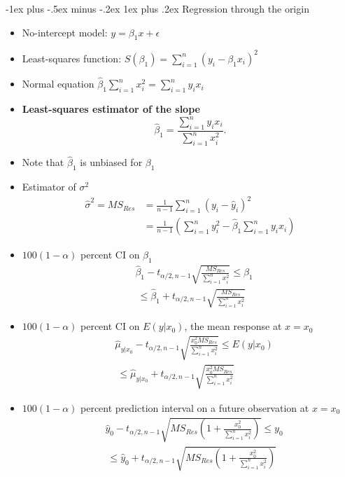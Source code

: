 \documentclass[frenchspacing,9pt,landscape,a4paper]{article}
\makeatletter
\renewcommand{\subsubsection}{\@startsection{subsubsection}{3}{0mm}%
                                {-1ex plus -.5ex minus -.2ex}%
                                {1ex plus .2ex}%
                                {\normalfont\small\bfseries}}
\makeatother
\begin{document}
\begin{multicols}{3}
\subsubsection{Regression through the origin}
\begin{itemize}
	\item No-intercept model: $y=\beta_1x+\epsilon$
	\item Least-squares function: $S(\beta_1)=\sum_{i=1}^n(y_i-\beta_1x_i)^2$
	\item Normal equation $\hat{\beta}_1\sum_{i=1}^n x_i^2=\sum_{i=1}^n y_ix_i$
	\item \textbf{Least-squares estimator of the slope}
		 \[
			 \hat{\beta}_1=\frac{\sum_{i=1}^n y_ix_i}{\sum_{i=1}^n x_i^2}
		.\]
	\item Note that $\hat{\beta}_1$ is unbiased for $\beta_1$
	\item Estimator of $\sigma^2$
		\begin{align*}
			\hat{\sigma}^2=MS_{Res}&=\frac{1}{n-1}\sum_{i=1}^n(y_i-\hat{y}_i)^2\\
								   &=\frac{1}{n-1}\left(\sum_{i=1}^n y_i^2-\hat{\beta}_1\sum_{i=1}^n y_ix_i\right)		
		\end{align*}	
	\item $100(1-\alpha)$ percent CI on  $\beta_1$
		\begin{align*}
			&\hat{\beta}_1-t_{\alpha /2,n-1}\sqrt{\frac{MS_{Res}}{\sum_{i=1}^n x_i^2}}\leq\beta_1\\
			&\ \leq\hat{\beta}_1+t_{\alpha /2,n-1}\sqrt{\frac{MS_{Res}}{\sum_{i=1}^n x_i^2}}
		\end{align*}
	\item $100(1-\alpha)$ percent CI on  $E(y|x_0)$, the mean response at $x=x_0$
		\begin{align*}
			&\hat{\mu}_{y|x_0}-t_{\alpha /2,n-1}\sqrt{\frac{x_0^2 MS_{Res}}{\sum_{i=1}^n x_i^2}}\leq E(y|x_0)\\
			&\ \leq\hat{\mu}_{y|x_0}+t_{\alpha /2,n-1}\sqrt{\frac{x_0^2 MS_{Res}}{\sum_{i=1}^n x_i^2}}
		\end{align*}
	\item $100(1-\alpha)$ percent prediction interval on a future observation at  $x=x_0$
		\begin{align*}
			&\hat{y}_0-t_{\alpha /2,n-1}\sqrt{MS_{Res}\left(1+\frac{x_0^2}{\sum_{i=1}^n x_i^2}\right)}\leq y_0\\
			&\ \leq\hat{y}_0+t_{\alpha /2,n-1}\sqrt{MS_{Res}\left(1+\frac{x_0^2}{\sum_{i=1}^n x_i^2}\right)}
		\end{align*}
\end{itemize}

\end{multicols}
\end{document}
